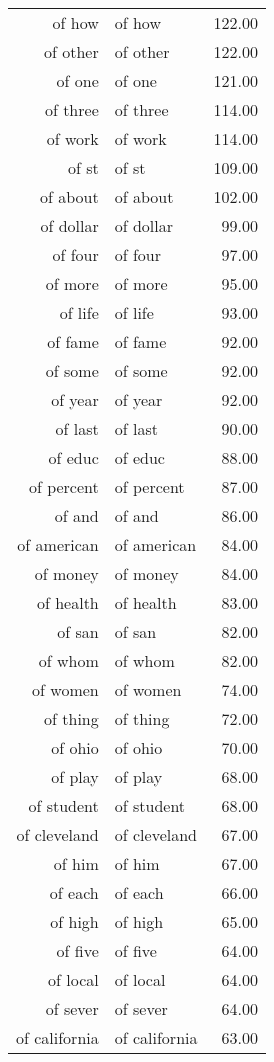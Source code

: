 \begin{table}[ht]
\begin{tabular}{rlr}
  of how & of how & 122.00 \\ 
  of other & of other & 122.00 \\ 
  of one & of one & 121.00 \\ 
  of three & of three & 114.00 \\ 
  of work & of work & 114.00 \\ 
  of st & of st & 109.00 \\ 
  of about & of about & 102.00 \\ 
  of dollar & of dollar & 99.00 \\ 
  of four & of four & 97.00 \\ 
  of more & of more & 95.00 \\ 
  of life & of life & 93.00 \\ 
  of fame & of fame & 92.00 \\ 
  of some & of some & 92.00 \\ 
  of year & of year & 92.00 \\ 
  of last & of last & 90.00 \\ 
  of educ & of educ & 88.00 \\ 
  of percent & of percent & 87.00 \\ 
  of and & of and & 86.00 \\ 
  of american & of american & 84.00 \\ 
  of money & of money & 84.00 \\ 
  of health & of health & 83.00 \\ 
  of san & of san & 82.00 \\ 
  of whom & of whom & 82.00 \\ 
  of women & of women & 74.00 \\ 
  of thing & of thing & 72.00 \\ 
  of ohio & of ohio & 70.00 \\ 
  of play & of play & 68.00 \\ 
  of student & of student & 68.00 \\ 
  of cleveland & of cleveland & 67.00 \\ 
  of him & of him & 67.00 \\ 
  of each & of each & 66.00 \\ 
  of high & of high & 65.00 \\ 
  of five & of five & 64.00 \\ 
  of local & of local & 64.00 \\ 
  of sever & of sever & 64.00 \\ 
  of california & of california & 63.00 \\ 

\end{tabular}
\end{table}
